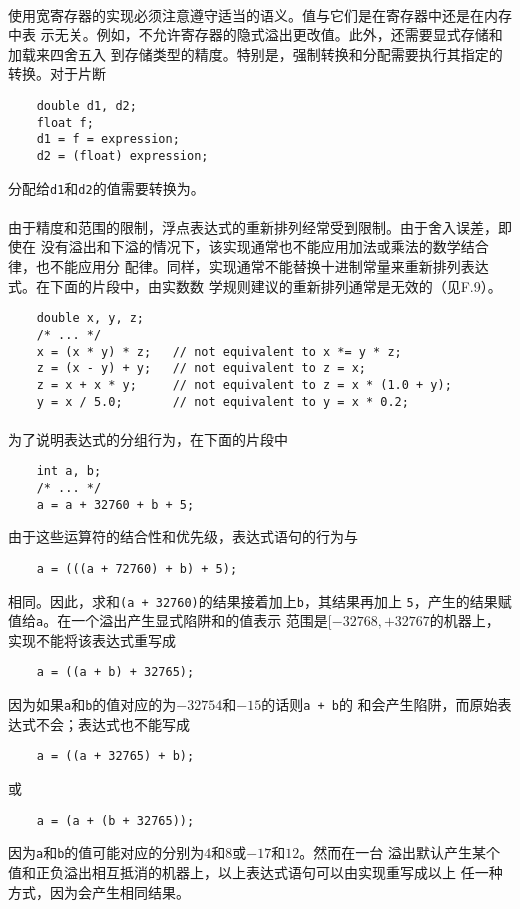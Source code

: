 \paragraph{}
\ex 使用宽寄存器的实现必须注意遵守适当的语义。值与它们是在寄存器中还是在内存中表
示无关。例如，不允许寄存器的隐式溢出更改值。此外，还需要显式存储和加载来四舍五入
到存储类型的精度。特别是，强制转换和分配需要执行其指定的转换。对于片断
\begin{lstlisting}
    double d1, d2;
    float f;
    d1 = f = expression;
    d2 = (float) expression;
\end{lstlisting}
分配给\texttt{d1}和\texttt{d2}的值需要转换为。

\paragraph{}
\ex 由于精度和范围的限制，浮点表达式的重新排列经常受到限制。由于舍入误差，即使在
没有溢出和下溢的情况下，该实现通常也不能应用加法或乘法的数学结合律，也不能应用分
配律。同样，实现通常不能替换十进制常量来重新排列表达式。在下面的片段中，由实数数
学规则建议的重新排列通常是无效的（见F.9）。
\begin{lstlisting}
    double x, y, z;
    /* ... */
    x = (x * y) * z;   // not equivalent to x *= y * z;
    z = (x - y) + y;   // not equivalent to z = x;
    z = x + x * y;     // not equivalent to z = x * (1.0 + y);
    y = x / 5.0;       // not equivalent to y = x * 0.2;
\end{lstlisting}

\paragraph{}
\ex 为了说明表达式的分组行为，在下面的片段中
\begin{lstlisting}
    int a, b;
    /* ... */
    a = a + 32760 + b + 5;
\end{lstlisting}
由于这些运算符的结合性和优先级，表达式语句的行为与
\begin{lstlisting}
    a = (((a + 72760) + b) + 5);
\end{lstlisting}
相同。因此，求和\texttt{(a + 32760)}的结果接着加上\texttt{b}，其结果再加上
\texttt{5}，产生的结果赋值给\texttt{a}。在一个溢出产生显式陷阱和的值表示
范围是$[-32768, +32767$的机器上，实现不能将该表达式重写成
\begin{lstlisting}
    a = ((a + b) + 32765);
\end{lstlisting}
因为如果\texttt{a}和\texttt{b}的值对应的为$-32754$和$-15$的话则\texttt{a + b}的
和会产生陷阱，而原始表达式不会；表达式也不能写成
\begin{lstlisting}
    a = ((a + 32765) + b);
\end{lstlisting}
或
\begin{lstlisting}
    a = (a + (b + 32765));
\end{lstlisting}
因为\texttt{a}和\texttt{b}的值可能对应的分别为$4$和$8$或$-17$和$12$。然而在一台
溢出默认产生某个值和正负溢出相互抵消的机器上，以上表达式语句可以由实现重写成以上
任一种方式，因为会产生相同结果。

